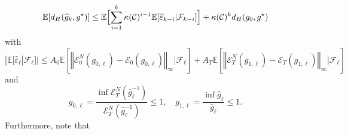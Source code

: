 \documentclass[a4paper,11pt]{amsart}
\theoremstyle{plain}
\theoremstyle{remark}
\begin{document}
\begin{eqnarray*}
\mathbb{E}[d_{H}(\widehat{g}_{k},g^{\star})]\leq  \mathbb{E}\Bigl[\sum_{i=1}^{k}\kappa(
\mathcal{C})  ^{i-1}\mathbb{E}[\widehat{\varepsilon}_{k-i}|\mathcal{F}_{k-i}]\Bigr]+\kappa(
\mathcal{C})  ^{k}d_{H}(g_{0},g^{\star})
\end{eqnarray*}
with 
\begin{equation*}
|\mathbb{E}[\widehat{\varepsilon}_{\ell}|\mathcal{F}_{\ell}]|\leq  A_0\mathbb{E}[\left\Vert \mathcal{E}_{0}^{N}(g_{0,\ell})-\mathcal{E}_{0}(g_{0,\ell})\right\Vert _{\infty}|\mathcal{F}_{\ell}]
+A_T\mathbb{E}[\left\Vert \mathcal{E}_{T}%
^{N}(g_{1,\ell})-\mathcal{E}_{T}(g_{1,\ell})\right\Vert
_{\infty}|\mathcal{F}_{\ell}]
\end{equation*}
and 
\[
g_{0,\ell}=\frac
{\inf\mathcal{E}_{T}^{N}( \widehat{g}_{\ell}^{-1})}{\mathcal{E}_{T}^{N}( \widehat{g}_{\ell}^{-1} 
)}\leq 1, \quad g_{1,\ell}=\frac{\inf  \widehat{g}_{\ell}}{ \widehat{g}_{\ell}}\leq 1.
\]
Furthermore, note that
\end{document}
